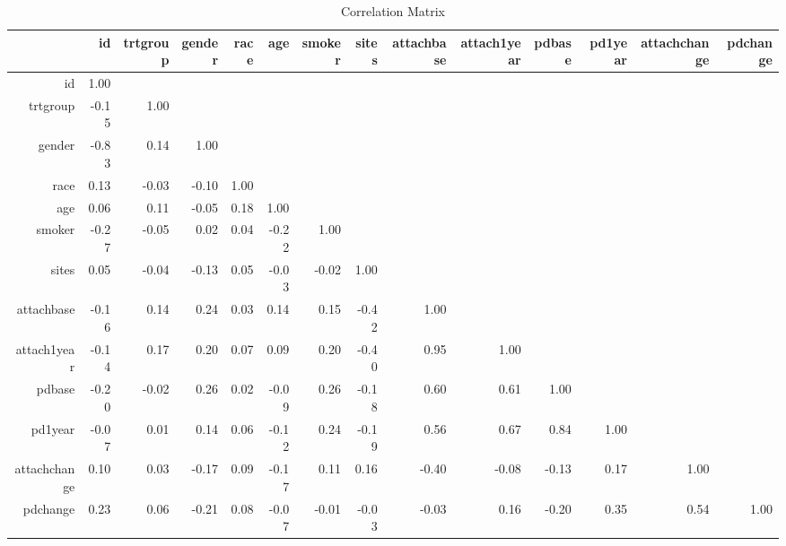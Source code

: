 \begin{table}[ht]
\centering
\begin{tabular}{rrrrrrrrrrrrrr}
  \hline
 & id & trtgroup & gender & race & age & smoker & sites & attachbase & attach1year & pdbase & pd1year & attachchange & pdchange \\ 
  \hline
id & 1.00 &  &  &  &  &  &  &  &  &  &  &  &  \\ 
  trtgroup & -0.15 & 1.00 &  &  &  &  &  &  &  &  &  &  &  \\ 
  gender & -0.83 & 0.14 & 1.00 &  &  &  &  &  &  &  &  &  &  \\ 
  race & 0.13 & -0.03 & -0.10 & 1.00 &  &  &  &  &  &  &  &  &  \\ 
  age & 0.06 & 0.11 & -0.05 & 0.18 & 1.00 &  &  &  &  &  &  &  &  \\ 
  smoker & -0.27 & -0.05 & 0.02 & 0.04 & -0.22 & 1.00 &  &  &  &  &  &  &  \\ 
  sites & 0.05 & -0.04 & -0.13 & 0.05 & -0.03 & -0.02 & 1.00 &  &  &  &  &  &  \\ 
  attachbase & -0.16 & 0.14 & 0.24 & 0.03 & 0.14 & 0.15 & -0.42 & 1.00 &  &  &  &  &  \\ 
  attach1year & -0.14 & 0.17 & 0.20 & 0.07 & 0.09 & 0.20 & -0.40 & 0.95 & 1.00 &  &  &  &  \\ 
  pdbase & -0.20 & -0.02 & 0.26 & 0.02 & -0.09 & 0.26 & -0.18 & 0.60 & 0.61 & 1.00 &  &  &  \\ 
  pd1year & -0.07 & 0.01 & 0.14 & 0.06 & -0.12 & 0.24 & -0.19 & 0.56 & 0.67 & 0.84 & 1.00 &  &  \\ 
  attachchange & 0.10 & 0.03 & -0.17 & 0.09 & -0.17 & 0.11 & 0.16 & -0.40 & -0.08 & -0.13 & 0.17 & 1.00 &  \\ 
  pdchange & 0.23 & 0.06 & -0.21 & 0.08 & -0.07 & -0.01 & -0.03 & -0.03 & 0.16 & -0.20 & 0.35 & 0.54 & 1.00 \\ 
   \hline
\end{tabular}
\caption{Correlation Matrix} 
\label{tab:correlation}
\end{table}
